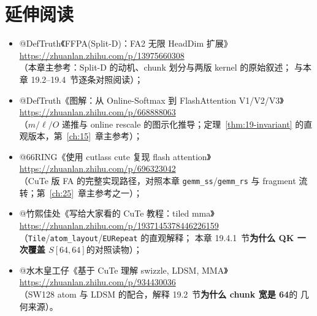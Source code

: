 \section*{延伸阅读}

\begin{itemize}
  \item @DefTruth《FFPA(Split-D)：FA2 无限 HeadDim 扩展》\\
        \url{https://zhuanlan.zhihu.com/p/13975660308}\\
        （本章主参考：Split-D 的动机、chunk 划分与两版 kernel 的原始叙述；
        与本章 19.2--19.4~节逐条对照阅读）；
  \item @DefTruth《图解：从 Online-Softmax 到 FlashAttention V1/V2/V3》\\
        \url{https://zhuanlan.zhihu.com/p/668888063}\\
        （$m/\ell/O$ 递推与 online rescale 的图示化推导；定理~\ref{thm:19-invariant}
        的直观版本，第~\ref{ch:15}~章主参考）；
  \item @66RING《使用 cutlass cute 复现 flash attention》\\
        \url{https://zhuanlan.zhihu.com/p/696323042}\\
        （CuTe 版 FA 的完整实现路径，对照本章 \texttt{gemm\_ss}/\texttt{gemm\_rs}
        与 fragment 流转；第~\ref{ch:25}~章主参考之一）；
  \item @竹熙佳处《写给大家看的 CuTe 教程：tiled mma》\\
        \url{https://zhuanlan.zhihu.com/p/1937145378446226159}\\
        （\texttt{Tile}/\texttt{atom\_layout}/\texttt{EURepeat} 的直观解释；
        本章 19.4.1~节\textbf{为什么 QK 一次覆盖 $S[64,64]$}的对照读物）；
  \item @水木皇工仔《基于 CuTe 理解 swizzle, LDSM, MMA》\\
        \url{https://zhuanlan.zhihu.com/p/934430036}\\
        （SW128 atom 与 LDSM 的配合，解释 19.2~节\textbf{为什么 chunk 宽是 64}的
        几何来源）。
\end{itemize}
